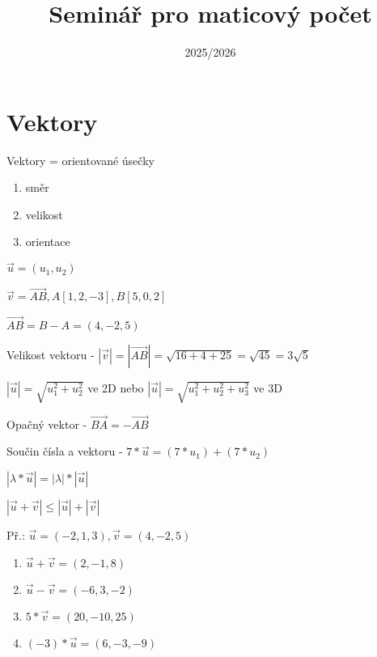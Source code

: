 \documentclass[12pt, a4paper]{scrartcl}
\title{Seminář pro maticový počet}
\date{2025/2026}
\begin{document}
    \maketitle

    \tableofcontents

    \section{Vektory}
    Vektory = orientované úsečky

    \begin{enumerate}
        \item směr
        \item velikost
        \item orientace
    \end{enumerate}

    $\overrightarrow{u} = (u_1, u_2)$

    $\overrightarrow{v} = \overrightarrow{AB}, A[1, 2, -3], B[5, 0, 2]$

    $\overrightarrow{AB} = B - A = (4, -2, 5)$

    Velikost vektoru - $|\overrightarrow{v}| = |\overrightarrow{AB}| = \sqrt{16 + 4 + 25} = \sqrt{45} = 3\sqrt{5}$

    $|\overrightarrow{u}| = \sqrt{u_1^2 + u_2^2}$ ve 2D nebo $|\overrightarrow{u}| = \sqrt{u_1^2 + u_2^2 + u_3^2}$ ve 3D

    Opačný vektor - $\overrightarrow{BA} = -\overrightarrow{AB}$

    Součin čísla a vektoru - $7 * \overrightarrow{u} = (7 * u_1) + (7 * u_2)$

    $|\lambda * \overrightarrow{u}| = |\lambda| * |\overrightarrow{u}|$

    $|\overrightarrow{u} + \overrightarrow{v}| \leq |\overrightarrow{u}| + |\overrightarrow{v}|$

    Př.: $\overrightarrow{u} = (-2, 1, 3), \overrightarrow{v} = (4, -2, 5)$
        \begin{enumerate}
            \item $\overrightarrow{u} + \overrightarrow{v} = (2, -1, 8)$
            \item $\overrightarrow{u} - \overrightarrow{v} = (-6, 3, -2)$
            \item $5 * \overrightarrow{v} = (20, -10, 25)$
            \item $(-3) * \overrightarrow{u} = (6, -3, -9)$
        \end{enumerate}
    
\end{document}
